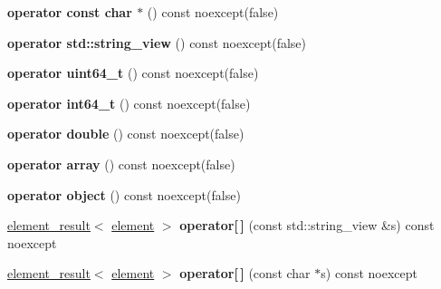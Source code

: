 \begin{DoxyCompactItemize}
{\bfseries operator const char $\ast$} () const noexcept(false)
\item 
\mbox{\label{classsimdjson_1_1document_1_1element__result_3_01document_1_1element_01_4_af0a07f4ea0cc2fe8ea0b812ce4aec322}} 
{\bfseries operator std\+::string\+\_\+view} () const noexcept(false)
\item 
\mbox{\label{classsimdjson_1_1document_1_1element__result_3_01document_1_1element_01_4_a81e8295d6bb2d15f8d2d317c70b635b8}} 
{\bfseries operator uint64\+\_\+t} () const noexcept(false)
\item 
\mbox{\label{classsimdjson_1_1document_1_1element__result_3_01document_1_1element_01_4_a7150e746e176ce47db092fdbd2dfc985}} 
{\bfseries operator int64\+\_\+t} () const noexcept(false)
\item 
\mbox{\label{classsimdjson_1_1document_1_1element__result_3_01document_1_1element_01_4_ae6c1eda1ed5d657195686a53dcedb114}} 
{\bfseries operator double} () const noexcept(false)
\item 
\mbox{\label{classsimdjson_1_1document_1_1element__result_3_01document_1_1element_01_4_a7fe9d26c273fcf98ba143477382f3c00}} 
{\bfseries operator array} () const noexcept(false)
\item 
\mbox{\label{classsimdjson_1_1document_1_1element__result_3_01document_1_1element_01_4_a52aca00947af3504bdfcdf485fa06e2d}} 
{\bfseries operator object} () const noexcept(false)
\item 
\mbox{\label{classsimdjson_1_1document_1_1element__result_3_01document_1_1element_01_4_a1cd826124683e35d00c97ec0d0bf1a15}} 
\hyperlink{classsimdjson_1_1document_1_1element__result}{element\+\_\+result}$<$ \hyperlink{classsimdjson_1_1document_1_1element}{element} $>$ {\bfseries operator\mbox{[}$\,$\mbox{]}} (const std\+::string\+\_\+view \&s) const noexcept
\item 
\mbox{\label{classsimdjson_1_1document_1_1element__result_3_01document_1_1element_01_4_ab0c4eddd32a34cc0c4ec96f57fb658e7}} 
\hyperlink{classsimdjson_1_1document_1_1element__result}{element\+\_\+result}$<$ \hyperlink{classsimdjson_1_1document_1_1element}{element} $>$ {\bfseries operator\mbox{[}$\,$\mbox{]}} (const char $\ast$s) const noexcept
\end{DoxyCompactItemize}
